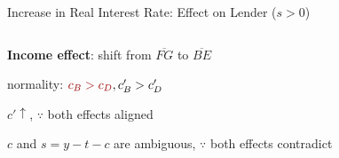 \documentclass[11pt,aspectratio=169,usenames,dvipsnames]{beamer}
\newcommand{\red}[1]{\textcolor{red}{#1}}
\let\tempone\itemize
\let\temptwo\enditemize
\renewenvironment{itemize}{\tempone\addtolength{\itemsep}{\fill}}{\temptwo}
\begin{document}
\begin{frame}{Increase in Real Interest Rate: Effect on Lender ($s > 0$)}
\begin{columns}
\begin{column}{0.5\textwidth}
\begin{itemize}
\begin{itemize}
                \end{itemize}
                \item \textbf{Income effect}: shift from $ \overline{FG} $ to $ \overline{BE} $
                \begin{itemize}
                    \item normality: $ \red{c_{B} > c_{D}}, c'_{B} > c'_{D} $
                    \item $ c' \uparrow $, $ \because $ both effects aligned
                    \item $ c $ and $ s = y - t - c $ are ambiguous, $ \because $ both effects contradict
                \end{itemize}
            \end{itemize}
        \end{column}
    \end{columns}
\end{frame}
\end{document}
